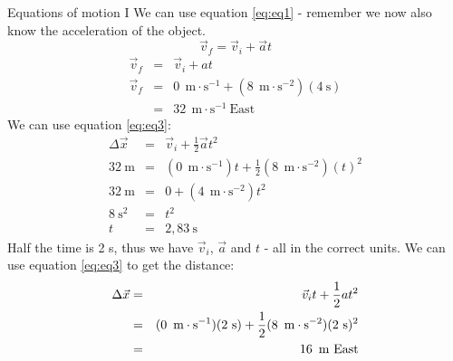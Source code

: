 \begin{wex}{Equations of motion I}
{ We can use equation \ref{eq:eq1} - remember we now also know the acceleration of the object.
\begin{displaymath}
\vec{v}_f = \vec{v}_i + \vec{a}t
\end{displaymath}
\begin{eqnarray*}
\vec{v}_f &=& \vec{v}_i + at\\
\vec{v}_f &=& 0\ ~\text{m}\cdot \text{s}^{-1} +(8\ ~\text{m}\cdot \text{s}^{-2})(4\ \text{s})\\
&=&32\ ~\text{m}\cdot \text{s}^{-1}~\text{East}
\end{eqnarray*}
We can use equation \ref{eq:eq3}:
\begin{eqnarray*}
\Delta \vec{x} &=& \vec{v}_i + \frac{1}{2}\vec{a}t^2\\
32\ \text{m} &=& (0\ ~\text{m}\cdot \text{s}^{-1})t + \frac{1}{2}(8\ ~\text{m}\cdot \text{s}^{-2})(t)^2\\
32\ \text{m} &=& 0 + (4\ ~\text{m}\cdot \text{s}^{-2})t^2\\
8\ \text{s}^2 &=& t^2\\
t &=& 2,83~\text{s}
\end{eqnarray*}
Half the time is 2 s, thus we have $\vec{v}_i$, $\vec{a}$ and $t$ - all in the correct units. We can use equation \ref{eq:eq3} to get the distance:
\begin{eqnarray*}
\Delta \vec{x}&=&\vec{v}_it+\frac{1}{2}at^2\\
&=&(0~\,\text{m} \cdot \text{s}^{-1})(2~\text{s})+\frac{1}{2}(8~\,\text{m} \cdot \text{s}^{-2})(2~\text{s})^2\\
&=&16\ \,\rm{m}~\text{East}
\end{eqnarray*}
}
\end{wex}
    \noindent
\label{m38796*secfhsst!!!underscore!!!id5845}
